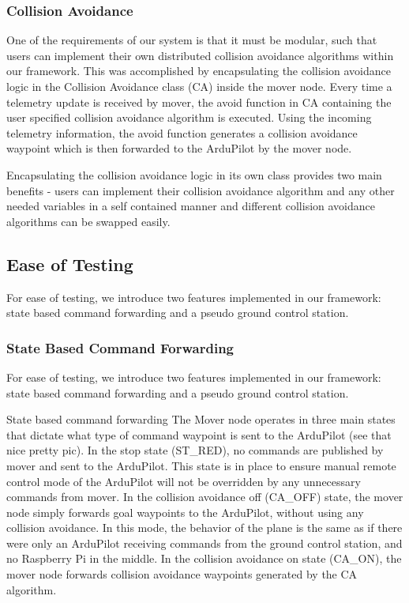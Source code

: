 \documentclass[conference]{IEEEtran}
\begin{document}
\subsubsection{Collision Avoidance}
One of the requirements of our system is that it must be modular, such that users can implement their own distributed collision avoidance algorithms within our framework. 
This was accomplished by encapsulating the collision avoidance logic in the Collision Avoidance class (CA) inside the mover node. Every time a telemetry update is received by mover, the avoid function in CA containing the user specified collision avoidance algorithm is executed. Using the incoming telemetry information, the avoid function generates a collision avoidance waypoint which is then forwarded to the ArduPilot by the mover node.

Encapsulating the collision avoidance logic in its own class provides two main benefits -  users can implement their collision avoidance algorithm and any other needed variables in a self contained manner and different collision avoidance algorithms can be swapped easily. 

\subsection{Ease of Testing}

For ease of testing, we introduce two features implemented in our framework: state based command forwarding and a pseudo ground control station.
\subsubsection{State Based Command Forwarding}
\label{sec:statebased}
For ease of testing, we introduce two features implemented in our framework: state based command forwarding and a pseudo ground control station.

State based command forwarding
The Mover node operates in three main states that dictate what type of command waypoint is sent to the ArduPilot (see that nice pretty pic). 
In the stop state (ST\_RED), no commands are published by mover and sent to the ArduPilot. This state is in place to ensure manual remote control mode of the ArduPilot will not be overridden by any unnecessary commands from mover.
In the collision avoidance off (CA\_OFF) state, the mover node simply forwards goal waypoints to the ArduPilot, without using any collision avoidance. In this mode, the behavior of the plane is the same as if there were only an ArduPilot receiving commands from the ground control station, and no Raspberry Pi in the middle. In the collision avoidance on state (CA\_ON), the mover node forwards collision avoidance waypoints generated by the CA algorithm. 
\end{document}
